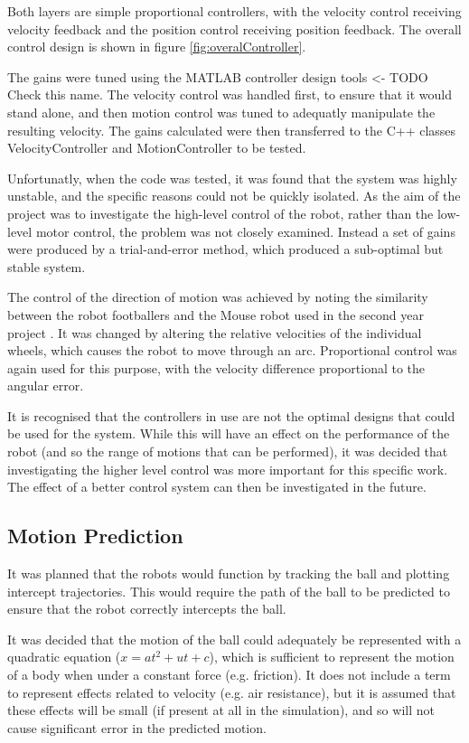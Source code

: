 \documentclass[10pt]{article}
\begin{document}
Both layers are simple proportional controllers, with the velocity control
receiving velocity feedback and the position control receiving position
feedback.  The overall control design is shown in figure
\ref{fig:overalController}.

The gains were tuned using the MATLAB controller design tools <- TODO Check this
name. The velocity control was handled first, to ensure that it would stand
alone, and then motion control was tuned to adequatly manipulate the resulting
velocity.  The gains calculated were then transferred to the C++ classes
VelocityController and MotionController to be tested.

Unfortunatly, when the code was tested, it was found that the system was highly
unstable, and the specific reasons could not be quickly isolated.  As the aim of
the project was to investigate the high-level control of the robot, rather than
the low-level motor control, the problem was not closely examined.  Instead a
set of gains were produced by a trial-and-error method, which produced a
sub-optimal but stable system.

The control of the direction of motion was achieved by noting the similarity
between the robot footballers and the Mouse robot used in the second year
project \cite{mouseProjectReport}.  It was changed by altering the relative
velocities of the individual wheels, which causes the robot to move through an
arc.  Proportional control was again used for this purpose, with the velocity
difference proportional to the angular error.

It is recognised that the controllers in use are not the optimal designs that
could be used for the system.  While this will have an effect on the performance
of the robot (and so the range of motions that can be performed), it was decided
that investigating the higher level control was more important for this specific
work.  The effect of a better control system can then be investigated in the
future.

\subsection{Motion Prediction}
It was planned that the robots would function by tracking the ball and plotting
intercept trajectories.  This would require the path of the ball to be predicted
to ensure that the robot correctly intercepts the ball.

It was decided that the motion of the ball could adequately be represented with
a quadratic equation ($x=at^2+ut+c$), which is sufficient to represent the
motion of a body when under a constant force (e.g. friction).  It does not
include a term to represent effects related to velocity (e.g. air resistance),
but it is assumed that these effects will be small (if present at all in the
simulation), and so will not cause significant error in the predicted motion.
\end{document}
